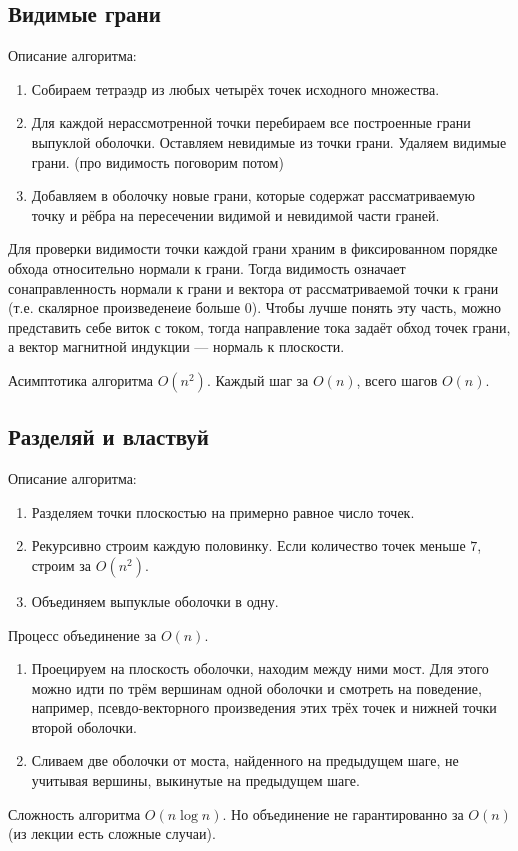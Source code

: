 \subsection{Видимые грани}

Описание алгоритма:
\begin{enumerate}
  \item Собираем тетраэдр из любых четырёх точек исходного множества.
  \item Для каждой нерассмотренной точки перебираем все построенные грани выпуклой оболочки. 
    Оставляем невидимые из точки грани. Удаляем видимые грани. (про видимость поговорим потом)
  \item Добавляем в оболочку новые грани, которые содержат рассматриваемую точку и рёбра на пересечении
    видимой и невидимой части граней.
\end{enumerate}

Для проверки видимости точки каждой грани храним в фиксированном порядке обхода относительно нормали
к грани. Тогда видимость означает сонаправленность нормали к грани и вектора от рассматриваемой точки к
грани (т.е. скалярное произведенеие больше $0$). Чтобы лучше понять эту часть, можно представить себе виток
с током, тогда направление тока задаёт обход точек грани, а вектор магнитной индукции --- нормаль к плоскости.

\begin{remark}
  Асимптотика алгоритма $O(n^2)$. Каждый шаг за $O(n)$, всего шагов $O(n)$.
\end{remark}

\subsection{Разделяй и властвуй}

Описание алгоритма:
\begin{enumerate}
  \item Разделяем точки плоскостью на примерно равное число точек.
  \item Рекурсивно строим каждую половинку. Если количество точек меньше $7$, строим за $O(n^2)$.
  \item Объединяем выпуклые оболочки в одну.
\end{enumerate}

Процесс объединение за $O(n)$.
\begin{enumerate}
  \item Проецируем на плоскость оболочки, находим между ними мост. Для этого можно идти по трём
    вершинам одной оболочки и смотреть на поведение, например, псевдо-векторного произведения этих
    трёх точек и нижней точки второй оболочки.
  \item Сливаем две оболочки от моста, найденного на
    предыдущем шаге, не учитывая вершины, выкинутые на предыдущем шаге.
\end{enumerate}

\begin{remark}
  Сложность алгоритма $O(n \log n)$. Но объединение не гарантированно за $O(n)$ 
  (из лекции есть сложные случаи).
\end{remark}

